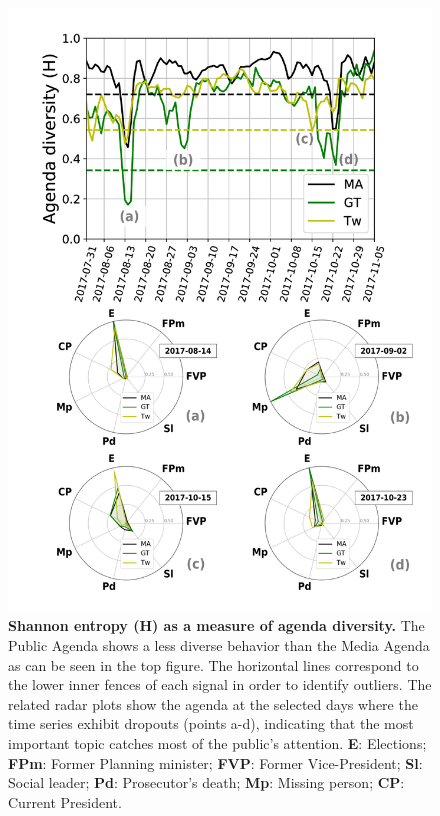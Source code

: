 \documentclass{bmcart}
\begin{document}
\begin{backmatter}
\begin{figure}[h!]
\includegraphics[height=0.7\textheight]{Fig3.pdf}
\caption{\textbf{Shannon entropy (H) as a measure of agenda diversity.} The Public Agenda shows a less diverse behavior than the Media Agenda as can be seen in the top figure. The horizontal lines correspond to the lower inner fences of each signal in order to identify outliers. The related radar plots show  the agenda at the selected days where the time series exhibit dropouts (points a-d), indicating that the most important topic catches most of the public's attention. \textbf{E}: Elections; \textbf{FPm}: Former Planning minister; \textbf{FVP}: Former Vice-President; \textbf{Sl}: Social leader; \textbf{Pd}: Prosecutor's death; \textbf{Mp}: Missing person; \textbf{CP}: Current President. }
\label{fig:shannon_entropy_agendas}
\end{figure}


\end{backmatter}
\end{document}
